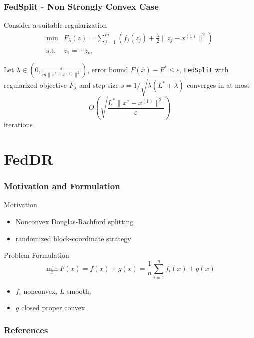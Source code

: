 
\begin{frame}
\frametitle{FedSplit - Non Strongly Convex Case}

Consider a suitable regularization
\begin{align*}
\min & F_{\lambda}(z) = \sum_{j=1}^m \left( f_j(z_j) + \frac{\lambda}{2}\lVert z_j - x^{(1)} \rVert^2 \right) \\
\text{s.t.} & z_1 = \cdots z_m
\end{align*}

\begin{thm}
Let $\lambda \in \left(0, \frac{\varepsilon}{m\lVert x^* - x^{(1)} \rVert^2}\right)$, error bound $F(\widehat{x}) - F^* \leqslant \varepsilon$, \texttt{FedSplit} with regularized objective $F_{\lambda}$ and step size $s = 1/\sqrt{\lambda(L^*+\lambda)}$ converges in at most
$$O \left( \sqrt{\frac{L^*\lVert x^* - x^{(1)} \rVert^2}{\varepsilon}} \right)$$
iterations
\end{thm}

\end{frame}


\section{FedDR}


\begin{frame}
\frametitle{Motivation and Formulation}

\begin{block}{Motivation}
\begin{itemize}
    \item Nonconvex Douglas-Rachford splitting
    \item randomized block-coordinate strategy
\end{itemize}
\end{block}

\begin{block}{Problem Formulation}
\ 
\vspace{-1.3em}
$$\min_x F(x) = f(x) + g(x) = \frac{1}{n} \sum_{i=1}^n f_i(x) + g(x)$$
\vspace{-1.3em}
\begin{itemize}
    \item $f_i$ nonconvex, $L$-smooth,
    \item $g$ closed proper convex
\end{itemize}
\end{block}



\end{frame}


\begin{frame}[allowframebreaks]
\frametitle{References}

{\footnotesize


}

\end{frame}




